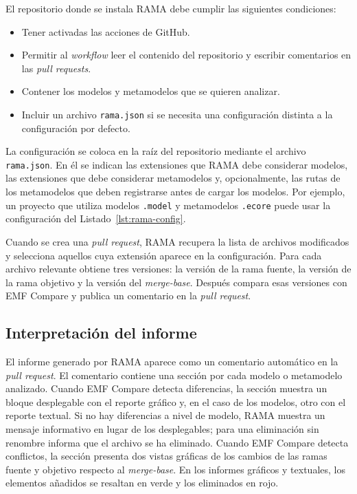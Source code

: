 \documentclass[11pt]{article}
\begin{document}
El repositorio donde se instala RAMA debe cumplir las siguientes condiciones:

\begin{itemize}
    \item Tener activadas las acciones de GitHub.
    \item Permitir al \textit{workflow} leer el contenido del repositorio y escribir comentarios en las \textit{pull requests}.
    \item Contener los modelos y metamodelos que se quieren analizar.
    \item Incluir un archivo \texttt{rama.json} si se necesita una configuración distinta a la configuración por defecto.
\end{itemize}

La configuración se coloca en la raíz del repositorio mediante el archivo \texttt{rama.json}. En él se indican las extensiones que RAMA debe considerar modelos, las extensiones que debe considerar metamodelos y, opcionalmente, las rutas de los metamodelos que deben registrarse antes de cargar los modelos. Por ejemplo, un proyecto que utiliza modelos \texttt{.model} y metamodelos \texttt{.ecore} puede usar la configuración del Listado~\ref{lst:rama-config}.

Cuando se crea una \textit{pull request}, RAMA recupera la lista de archivos modificados y selecciona aquellos cuya extensión aparece en la configuración. Para cada archivo relevante obtiene tres versiones: la versión de la rama fuente, la versión de la rama objetivo y la versión del \textit{merge-base}. Después compara esas versiones con EMF Compare y publica un comentario en la \textit{pull request}.

\subsection{Interpretación del informe}

El informe generado por RAMA aparece como un comentario automático en la \textit{pull request}. El comentario contiene una sección por cada modelo o metamodelo analizado. Cuando EMF Compare detecta diferencias, la sección muestra un bloque desplegable con el reporte gráfico y, en el caso de los modelos, otro con el reporte textual. Si no hay diferencias a nivel de modelo, RAMA muestra un mensaje informativo en lugar de los desplegables; para una eliminación sin renombre informa que el archivo se ha eliminado. Cuando EMF Compare detecta conflictos, la sección presenta dos vistas gráficas de los cambios de las ramas fuente y objetivo respecto al \textit{merge-base}. En los informes gráficos y textuales, los elementos añadidos se resaltan en verde y los eliminados en rojo.
\end{document}
